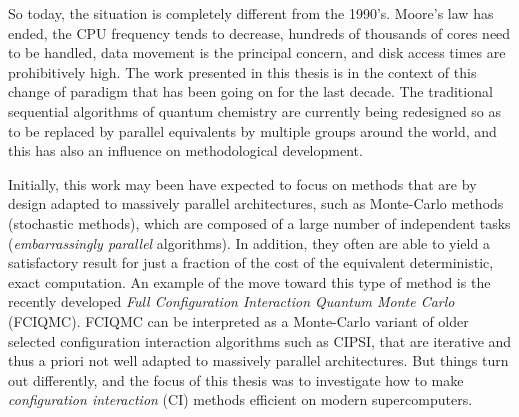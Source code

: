 \documentclass[12pt,a4paper]{report}
\begin{document}
So today, the situation is completely different from the 1990's.
Moore's law has ended,\cite{Khan2018Jan} the CPU frequency tends to decrease,
hundreds of thousands of cores need to be handled, data movement is the
principal concern, and disk access times are prohibitively high.
The work presented in this thesis is in the context of this change of paradigm
that has been going on for the last decade.
The traditional sequential algorithms of quantum chemistry are currently being
redesigned so as to be replaced by parallel equivalents by multiple groups
around the world, and this has also an influence on methodological development.

Initially, this work may been have expected to focus on methods that are by
design adapted to massively parallel architectures, such as Monte-Carlo methods
(stochastic methods), which are composed of a large number of independent tasks
(\emph{embarrassingly parallel} algorithms). In addition, they often are able
to yield a satisfactory result for just a fraction of the cost of the
equivalent deterministic, exact computation. An example of the move toward this
type of method is the recently developed \emph{Full Configuration Interaction
Quantum Monte Carlo} (FCIQMC).\cite{Booth_2009} FCIQMC can be interpreted as a
Monte-Carlo variant of older selected configuration interaction algorithms such as
CIPSI,\cite{Huron_1973} that are iterative and thus a priori not well adapted to
massively parallel architectures. But things turn out differently, and the
focus of this thesis was to investigate how to make \emph{configuration
interaction} (CI) methods efficient on modern supercomputers.
\end{document}
